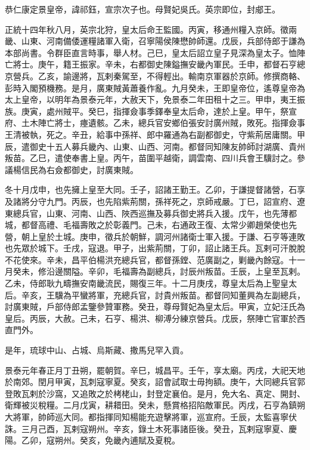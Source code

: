
\begin{pinyinscope}
恭仁康定景皇帝，諱祁鈺，宣宗次子也。母賢妃吳氏。英宗即位，封郕王。

正統十四年秋八月，英宗北狩，皇太后命王監國。丙寅，移通州糧入京師。徵兩畿、山東、河南備倭運糧諸軍入衛，召寧陽侯陳懋帥師還。戊辰，兵部侍郎于謙為本部尚書。令群臣直言時事，舉人材。己巳，皇太后詔立皇子見深為皇太子。恤陣亡將士。庚午，籍王振家。辛未，右都御史陳鎰撫安畿內軍民。壬申，都督石亨總京營兵。乙亥，諭邊將，瓦剌秦駕至，不得輕出。輸南京軍器於京師。修撰商輅、彭時入閣預機務。是月，廣東賊黃蕭養作亂。九月癸未，王即皇帝位，遙尊皇帝為太上皇帝，以明年為景泰元年，大赦天下，免景泰二年田租十之三。甲申，夷王振族。庚寅，處州賊平。癸巳，指揮僉事季鐸奉皇太后命，達於上皇。甲午，祭宣府、土木陣亡將士，瘞遺骸。乙未，總兵官安鄉伯張安討廣州賊，敗死。指揮僉事王清被執，死之。辛丑，給事中孫祥、郎中羅通為右副都御史，守紫荊居庸關。甲辰，遣御史十五人募兵畿內、山東、山西、河南。都督同知陳友帥師討湖廣、貴州叛苗。乙巳，遣使奉書上皇。丙午，苗圍平越衛，調雲南、四川兵會王驥討之。參議楊信民為右僉都御史，討廣東賊。

冬十月戊申，也先擁上皇至大同。壬子，詔諸王勤王。乙卯，于謙提督諸營，石享及諸將分守九門。丙辰，也先陷紫荊關，孫祥死之，京師戒嚴。丁巳，詔宣府、遼東總兵官，山東、河南、山西、陜西巡撫及募兵御史將兵入援。戊午，也先薄都城，都督高禮、毛福壽敗之於彰義門。己未，右通政王復、太常少卿趙榮使也先營，朝上皇於土城。庚申，徵兵於朝鮮，調河州諸衛士軍入援。于謙、石亨等連敗也先眾於城下。壬戌，寇退。甲子，出紫荊關，丁卯，詔止諸王兵。瓦剌可汗脫脫不花使來。辛未，昌平伯楊洪充總兵官，都督孫鏜、范廣副之，剿畿內餘寇。十一月癸未，修沿邊關隘。辛卯，毛福壽為副總兵，討辰州叛苗。壬辰，上皇至瓦剌。乙未，侍郎耿九疇撫安南畿流民，賜復三年。十二月庚戌，尊皇太后為上聖皇太后。辛亥，王驥為平蠻將軍，充總兵官，討貴州叛苗。都督同知董興為左副總兵，討廣東賊，戶部侍郎孟鑒參贊軍務。癸丑，尊母賢妃為皇太后。甲寅，立妃汪氏為皇后。丙辰，大赦。己未，石亨、楊洪、柳溥分練京營兵。戊辰，祭陣亡官軍於西直門外。

是年，琉球中山、占城、烏斯藏、撒馬兒罕入貢。

景泰元年春正月丁丑朔，罷朝賀。辛巳，城昌平。壬午，享太廟。丙戌，大祀天地於南郊。閏月甲寅，瓦刺寇寧夏。癸亥，詔會試取士毋拘額。庚午，大同總兵官郭登敗瓦剌於沙窩，又追敗之於栲栳山，封登定襄伯。是月，免大名、真定、開封、衛輝被災稅糧。二月戊寅，耕耤田。癸未，懸賞格招陷敵軍民。丙戌，石亨為鎮朔大將軍，帥師巡大同。都指揮同知楊能充遊擊將軍，巡宣府。壬辰，太監喜寧伏誅。三月己酉，瓦剌寇朔州。辛亥，錄土木死事諸臣後。癸丑，瓦剌寇寧夏、慶陽。乙卯，寇朔州。癸亥，免畿內逋賦及夏稅。


\end{pinyinscope}
